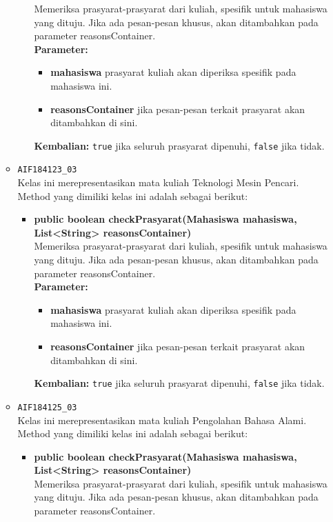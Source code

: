 \begin{enumerate}
\begin{itemize}
\begin{itemize}
			Memeriksa prasyarat-prasyarat dari kuliah, spesifik untuk mahasiswa yang dituju. Jika ada pesan-pesan khusus, akan ditambahkan pada parameter reasonsContainer.\\
			\textbf{Parameter:}
			\begin{itemize}
				\item \textbf{mahasiswa} prasyarat kuliah akan diperiksa spesifik pada mahasiswa ini.
				\item \textbf{reasonsContainer} jika pesan-pesan terkait prasyarat akan ditambahkan di sini.
			\end{itemize}
			\textbf{Kembalian:} \texttt{true} jika seluruh prasyarat dipenuhi, \texttt{false} jika tidak.
		\end{itemize}
		\item \texttt{AIF184123\_03} \\
		Kelas ini merepresentasikan mata kuliah Teknologi Mesin Pencari. Method yang dimiliki kelas ini adalah sebagai berikut: 
		\begin{itemize}
			\item \textbf{public boolean checkPrasyarat(Mahasiswa mahasiswa, List<String> reasonsContainer)}\\
			Memeriksa prasyarat-prasyarat dari kuliah, spesifik untuk mahasiswa yang dituju. Jika ada pesan-pesan khusus, akan ditambahkan pada parameter reasonsContainer.\\
			\textbf{Parameter:}
			\begin{itemize}
				\item \textbf{mahasiswa} prasyarat kuliah akan diperiksa spesifik pada mahasiswa ini.
				\item \textbf{reasonsContainer} jika pesan-pesan terkait prasyarat akan ditambahkan di sini.
			\end{itemize}
			\textbf{Kembalian:} \texttt{true} jika seluruh prasyarat dipenuhi, \texttt{false} jika tidak.
		\end{itemize}
		\item \texttt{AIF184125\_03} \\
		Kelas ini merepresentasikan mata kuliah Pengolahan Bahasa Alami. Method yang dimiliki kelas ini adalah sebagai berikut: 
		\begin{itemize}
			\item \textbf{public boolean checkPrasyarat(Mahasiswa mahasiswa, List<String> reasonsContainer)}\\
			Memeriksa prasyarat-prasyarat dari kuliah, spesifik untuk mahasiswa yang dituju. Jika ada pesan-pesan khusus, akan ditambahkan pada parameter reasonsContainer.\\

\end{itemize}
\end{itemize}
\end{enumerate}
